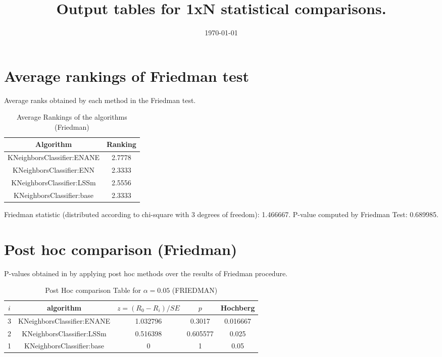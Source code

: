 \documentclass[a4paper,10pt]{article}
\title{Output tables for 1xN statistical comparisons.}
\author{}
\date{\today}
\begin{document}
\begin{landscape}
\pagestyle{empty}
\maketitle
\thispagestyle{empty}

\section{Average rankings of Friedman test}


Average ranks obtained by each method in the Friedman test.

\begin{table}[!htp]
\centering
\begin{tabular}{|c|c|}\hline
Algorithm&Ranking\\\hline
KNeighborsClassifier:ENANE&2.7778\\KNeighborsClassifier:ENN&2.3333\\KNeighborsClassifier:LSSm&2.5556\\KNeighborsClassifier:base&2.3333\\\hline\end{tabular}
\caption{Average Rankings of the algorithms (Friedman)}
\end{table}

Friedman statistic (distributed according to chi-square with 3 degrees of freedom): 1.466667. \newline P-value computed by Friedman Test: 0.689985.\newline


\newpage

\section{Post hoc comparison (Friedman)}


P-values obtained in by applying post hoc methods over the results of Friedman procedure.

\begin{table}[!htp]
\centering\footnotesize
\begin{tabular}{ccccc}
$i$&algorithm&$z=(R_0 - R_i)/SE$&$p$&Hochberg \\
\hline3&KNeighborsClassifier:ENANE&1.032796&0.3017&0.016667\\2&KNeighborsClassifier:LSSm&0.516398&0.605577&0.025\\1&KNeighborsClassifier:base&0&1&0.05\\\hline
\end{tabular}
\caption{Post Hoc comparison Table for $\alpha=0.05$ (FRIEDMAN)}
\end{table}
\newpage


\end{landscape}
\end{document}
